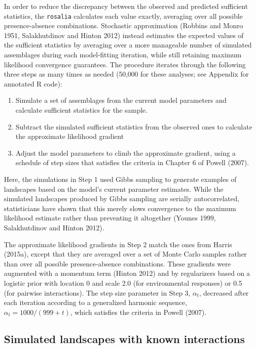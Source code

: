 \documentclass[12pt,]{article}
\begin{document}
\begin{spacing}{1.9}
\begin{flushleft}
In order to reduce the discrepancy between the observed and predicted
sufficient statistics, the \texttt{rosalia} calculates each value
exactly, averaging over all possible presence-absence combinations.
Stochastic approximation (Robbins and Monro 1951, Salakhutdinov and
Hinton 2012) instead estimates the expected values of the sufficient
statistics by averaging over a more manageable number of simulated
assemblages during each model-fitting iteration, while still retaining
maximum likelihood convergence guarantees. The procedure iterates
through the following three steps as many times as needed (50,000 for
these analyses; see Appendix for annotated R code):

\begin{enumerate}
\def\labelenumi{\arabic{enumi}.}
\item
  Simulate a set of assemblages from the current model parameters and
  calculate sufficient statistics for the sample.
\item
  Subtract the simulated sufficient statistics from the observed ones to
  calculate the approximate likelihood gradient
\item
  Adjust the model parameters to climb the approximate gradient, using a
  schedule of step sizes that satisfies the criteria in Chapter 6 of
  Powell (2007).
\end{enumerate}

Here, the simulations in Step 1 used Gibbs sampling to generate examples
of landscapes based on the model's current parameter estimates. While
the simulated landscapes produced by Gibbs sampling are serially
autocorrelated, statisticians have shown that this merely slows
convergence to the maximum likelihood estimate rather than preventing it
altogether (Younes 1999, Salakhutdinov and Hinton 2012).

The approximate likelihood gradients in Step 2 match the ones from
Harris (2015a), except that they are averaged over a set of Monte Carlo
samples rather than over all possible presence-absence combinations.
These gradients were augmented with a momentum term (Hinton 2012) and by
regularizers based on a logistic prior with location 0 and scale 2.0
(for environmental responses) or 0.5 (for pairwise interactions). The
step size parameter in Step 3, \(\alpha_t\), decreased after each
iteration according to a generalized harmonic sequence,
\(\alpha_t = 1000/(999 + t)\), which satisfies the criteria in Powell
(2007).

\subsection{Simulated landscapes with known
interactions}\label{simulated-landscapes-with-known-interactions}


\end{flushleft}
\end{spacing}
\end{document}
